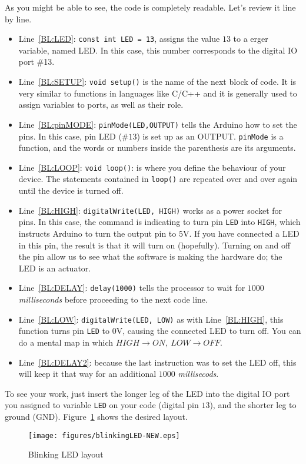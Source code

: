 As you might be able to see, the code is completely readable. Let's review it line by line.

\begin{itemize}
	\item Line~\ref{BL:LED}: \texttt{const int LED = 13}, assigns the value $13$ to a \texttt{\color{red}{int}}erger variable, named LED. In this case, this number corresponds to the digital IO port \#13.
	\item Line~\ref{BL:SETUP}: \texttt{void setup()} is the name of the next block of code. It is very similar to functions in languages like C/C++ and it is generally used to assign variables to ports, as well as their role.
	\item Line~\ref{BL:pinMODE}: \texttt{pinMode(LED,OUTPUT)} tells the Arduino how to set the pins. In this case, pin LED ($\#13$) is set up as an OUTPUT. \texttt{pinMode} is a function, and the words or numbers inside the parenthesis are its arguments.
	\item Line~\ref{BL:LOOP}: \texttt{void loop()}: is where you define the behaviour of your device. The statements contained in \texttt{loop()} are repeated over and over again until the device is turned off.
	\item Line~\ref{BL:HIGH}: \texttt{digitalWrite(LED, HIGH)} works as a power socket for pins. In this case, the command is indicating to turn pin \texttt{LED} into \texttt{HIGH}, which instructs Arduino to turn the output pin to $5$V. If you have connected a LED in this pin, the result is that it will turn on (hopefully). Turning on and off the pin allow us to see what the software is making the hardware do; the LED is an actuator.
	\item Line~\ref{BL:DELAY}: \texttt{delay(1000)} tells the processor to wait for $1000$ \emph{milliseconds} before proceeding to the next code line.
	\item Line~\ref{BL:LOW}: \texttt{digitalWrite(LED, LOW)} as with Line~\ref{BL:HIGH}, this function turns pin \texttt{LED} to $0$V, causing the connected LED to turn off. You can do a mental map in which $HIGH \rightarrow ON,\ LOW \rightarrow OFF$.
	\item Line~\ref{BL:DELAY2}: because the last instruction was to set the LED off, this will keep it that way for an additional $1000$ \emph{millisecods}.
\end{itemize}

To see your work, just insert the longer leg of the LED into the digital IO port you assigned to variable \texttt{LED} on your code (digital pin $13$), and the shorter leg to ground (GND). Figure~\ref{fig:blinkingLEDLayout} shows the desired layout.

\begin{figure}[htbp]
  \centering
  \texttt{[image: figures/blinkingLED-NEW.eps]}
  \caption{Blinking LED layout
  \label{fig:blinkingLEDLayout}}
\end{figure}
